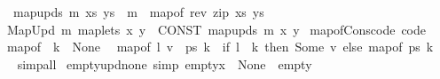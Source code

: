 \begin{isabellebody}
\ \ \ {\isachardoublequoteopen}map{\isacharunderscore}{\kern0pt}upds\ m\ xs\ ys\ {\isacharequal}{\kern0pt}\ m\ {\isacharplus}{\kern0pt}{\isacharplus}{\kern0pt}\ map{\isacharunderscore}{\kern0pt}of\ {\isacharparenleft}{\kern0pt}rev\ {\isacharparenleft}{\kern0pt}zip\ xs\ ys{\isacharparenright}{\kern0pt}{\isacharparenright}{\kern0pt}{\isachardoublequoteclose}\isanewline
{}\isamarkupfalse%
\isanewline
\ \ {\isachardoublequoteopen}{\isacharunderscore}{\kern0pt}MapUpd\ m\ {\isacharparenleft}{\kern0pt}{\isacharunderscore}{\kern0pt}maplets\ x\ y{\isacharparenright}{\kern0pt}{\isachardoublequoteclose}\ {\isasymrightleftharpoons}\ {\isachardoublequoteopen}CONST\ map{\isacharunderscore}{\kern0pt}upds\ m\ x\ y{\isachardoublequoteclose}\isanewline
\isanewline
{}\isamarkupfalse%
\ map{\isacharunderscore}{\kern0pt}of{\isacharunderscore}{\kern0pt}Cons{\isacharunderscore}{\kern0pt}code\ {\isacharbrackleft}{\kern0pt}code{\isacharbrackright}{\kern0pt}{\isacharcolon}{\kern0pt}\isanewline
\ \ {\isachardoublequoteopen}map{\isacharunderscore}{\kern0pt}of\ {\isacharbrackleft}{\kern0pt}{\isacharbrackright}{\kern0pt}\ k\ {\isacharequal}{\kern0pt}\ None{\isachardoublequoteclose}\isanewline
\ \ {\isachardoublequoteopen}map{\isacharunderscore}{\kern0pt}of\ {\isacharparenleft}{\kern0pt}{\isacharparenleft}{\kern0pt}l{\isacharcomma}{\kern0pt}\ v{\isacharparenright}{\kern0pt}\ {\isacharhash}{\kern0pt}\ ps{\isacharparenright}{\kern0pt}\ k\ {\isacharequal}{\kern0pt}\ {\isacharparenleft}{\kern0pt}if\ l\ {\isacharequal}{\kern0pt}\ k\ then\ Some\ v\ else\ map{\isacharunderscore}{\kern0pt}of\ ps\ k{\isacharparenright}{\kern0pt}{\isachardoublequoteclose}\isanewline
%
\isadelimproof
\ \ %
\endisadelimproof
%
\isatagproof
{}\isamarkupfalse%
\ simp{\isacharunderscore}{\kern0pt}all%
\endisatagproof
{\isafoldproof}%
%
\isadelimproof
%
\endisadelimproof
%
\isadelimdocument
%
\endisadelimdocument
%
\isatagdocument
%
\isamarkuptrue%
%
\endisatagdocument
{\isafolddocument}%
%
\isadelimdocument
%
\endisadelimdocument
{}\isamarkupfalse%
\ empty{\isacharunderscore}{\kern0pt}upd{\isacharunderscore}{\kern0pt}none\ {\isacharbrackleft}{\kern0pt}simp{\isacharbrackright}{\kern0pt}{\isacharcolon}{\kern0pt}\ {\isachardoublequoteopen}empty{\isacharparenleft}{\kern0pt}x\ {\isacharcolon}{\kern0pt}{\isacharequal}{\kern0pt}\ None{\isacharparenright}{\kern0pt}\ {\isacharequal}{\kern0pt}\ empty{\isachardoublequoteclose}\isanewline
%
\isadelimproof
\ \ %
\endisadelimproof
%
\isatagproof
{}\isamarkupfalse%

\end{isabellebody}

